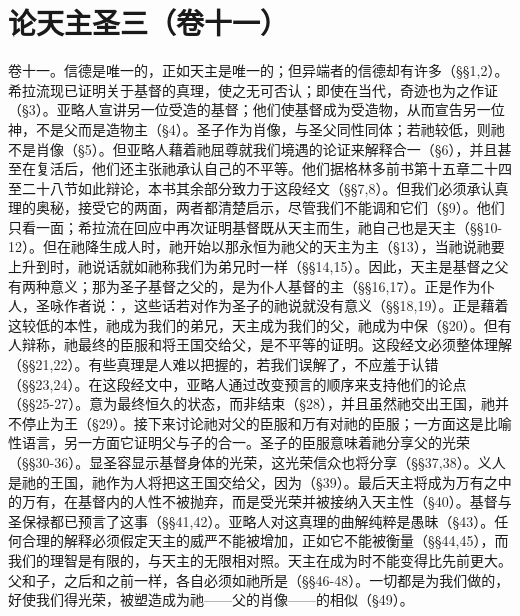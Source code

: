 

\section{论天主圣三（卷十一）}

卷十一。信德是唯一的，正如天主是唯一的；但异端者的信德却有许多（§§1,2）。希拉流现已证明关于基督的真理，使之无可否认；即使在当代，奇迹也为之作证（§3）。亚略人宣讲另一位受造的基督；他们使基督成为受造物，从而宣告另一位神，不是父而是造物主（§4）。圣子作为肖像，与圣父同性同体；若祂较低，则祂不是肖像（§5）。但亚略人藉着祂屈尊就我们境遇的论证来解释合一（§6），并且甚至在复活后，他们还主张祂承认自己的不平等。他们据格林多前书第十五章二十四至二十八节如此辩论，本书其余部分致力于这段经文（§§7,8）。但我们必须承认真理的奥秘，接受它的两面，两者都清楚启示，尽管我们不能调和它们（§9）。他们只看一面；希拉流在回应中再次证明基督既从天主而生，祂自己也是天主（§§10-12）。但在祂降生成人时，祂开始以那永恒为祂父的天主为主（§13），当祂说祂要上升到时，祂说话就如祂称我们为弟兄时一样（§§14,15）。因此，天主是基督之父有两种意义；那为圣子基督之父的，是为仆人基督的主（§§16,17）。正是作为仆人，圣咏作者说：，这些话若对作为圣子的祂说就没有意义（§§18,19）。正是藉着这较低的本性，祂成为我们的弟兄，天主成为我们的父，祂成为中保（§20）。但有人辩称，祂最终的臣服和将王国交给父，是不平等的证明。这段经文必须整体理解（§§21,22）。有些真理是人难以把握的，若我们误解了，不应羞于认错（§§23,24）。在这段经文中，亚略人通过改变预言的顺序来支持他们的论点（§§25-27）。意为最终恒久的状态，而非结束（§28），并且虽然祂交出王国，祂并不停止为王（§29）。接下来讨论祂对父的臣服和万有对祂的臣服；一方面这是比喻性语言，另一方面它证明父与子的合一。圣子的臣服意味着祂分享父的光荣（§§30-36）。显圣容显示基督身体的光荣，这光荣信众也将分享（§§37,38）。义人是祂的王国，祂作为人将把这王国交给父，因为（§39）。最后天主将成为万有之中的万有，在基督内的人性不被抛弃，而是受光荣并被接纳入天主性（§40）。基督与圣保禄都已预言了这事（§§41,42）。亚略人对这真理的曲解纯粹是愚昧（§43）。任何合理的解释必须假定天主的威严不能被增加，正如它不能被衡量（§§44,45），而我们的理智是有限的，与天主的无限相对照。天主在成为时不能变得比先前更大。父和子，之后和之前一样，各自必须如祂所是（§§46-48）。一切都是为我们做的，好使我们得光荣，被塑造成为祂——父的肖像——的相似（§49）。\par

